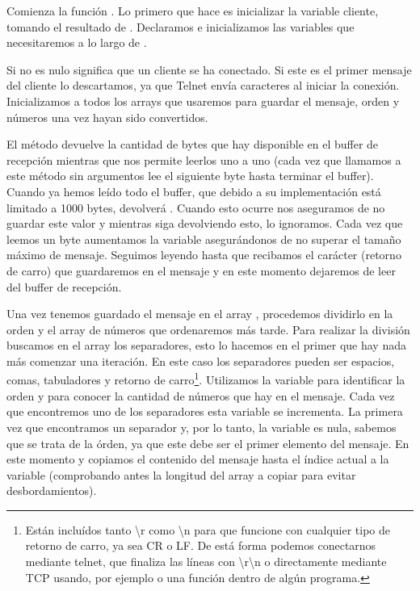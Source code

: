 
Comienza la función . Lo primero que hace es inicializar la variable cliente, tomando el resultado de . Declaramos e inicializamos las variables que necesitaremos a lo largo de .


Si  no es nulo significa que un cliente se ha conectado. Si este es el primer mensaje del cliente lo descartamos, ya que Telnet envía caracteres al iniciar la conexión. Inicializamos a  todos los arrays que usaremos para guardar el mensaje, orden y números una vez hayan sido convertidos.


El método  devuelve la cantidad de bytes que hay disponible en el buffer de recepción mientras que  nos permite leerlos uno a uno (cada vez que llamamos a este método sin argumentos lee el siguiente byte hasta terminar el buffer). Cuando ya hemos leído todo el buffer, que debido a su implementación está limitado a 1000 bytes,  devolverá . Cuando esto ocurre nos aseguramos de no guardar este valor y mientras siga devolviendo esto, lo ignoramos. Cada vez que leemos un byte aumentamos la variable  asegurándonos de no superar el tamaño máximo de mensaje. Seguimos leyendo hasta que recibamos el carácter  (retorno de carro) que guardaremos en el mensaje y en este momento dejaremos de leer del buffer de recepción.


Una vez tenemos guardado el mensaje en el array , procedemos dividirlo en la orden y el array de números que ordenaremos más tarde. Para realizar la división buscamos en el array los separadores, esto lo hacemos en el primer  que hay nada más comenzar una iteración. En este caso los separadores pueden ser espacios, comas, tabuladores y retorno de carro\protect\footnote{Están incluídos tanto \textbackslash r como \textbackslash n para que funcione con cualquier tipo de retorno de carro, ya sea CR o LF. De está forma podemos conectarnos mediante telnet, que finaliza las líneas con \textbackslash r\textbackslash n o directamente mediante TCP usando, por ejemplo  o una función dentro de algún programa.}. Utilizamos la variable  para identificar la orden y para conocer la cantidad de números que hay en el mensaje. Cada vez que encontremos uno de los separadores esta variable se incrementa. La primera vez que encontramos un separador y, por lo tanto, la variable  es nula, sabemos que se trata de la órden, ya que este debe ser el primer elemento del mensaje. En este momento y copiamos el contenido del mensaje hasta el índice actual a la variable  (comprobando antes la longitud del array a copiar para evitar desbordamientos).

